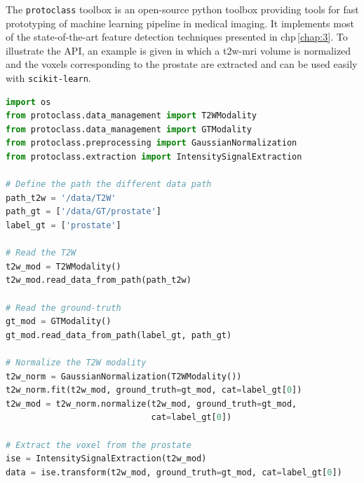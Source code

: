 The \texttt{protoclass} toolbox is an open-source python toolbox providing tools for fast prototyping of machine learning pipeline in medical imaging.
It implements most of the state-of-the-art feature detection techniques presented in \acs{chp}\,\ref{chap:3}.
To illustrate the API, an example is given in which a \ac{t2w}-\ac{mri} volume is normalized and the voxels corresponding to the prostate are extracted and can be used easily with \texttt{scikit-learn}.

\begin{lstlisting}[language=Python, caption=Code snippet to normalize a volume and extract some voxels.]
import os
from protoclass.data_management import T2WModality
from protoclass.data_management import GTModality
from protoclass.preprocessing import GaussianNormalization
from protoclass.extraction import IntensitySignalExtraction

# Define the path the different data path
path_t2w = '/data/T2W'
path_gt = ['/data/GT/prostate']
label_gt = ['prostate']

# Read the T2W
t2w_mod = T2WModality()
t2w_mod.read_data_from_path(path_t2w)

# Read the ground-truth
gt_mod = GTModality()
gt_mod.read_data_from_path(label_gt, path_gt)

# Normalize the T2W modality
t2w_norm = GaussianNormalization(T2WModality())
t2w_norm.fit(t2w_mod, ground_truth=gt_mod, cat=label_gt[0])
t2w_mod = t2w_norm.normalize(t2w_mod, ground_truth=gt_mod,
                             cat=label_gt[0])

# Extract the voxel from the prostate
ise = IntensitySignalExtraction(t2w_mod)
data = ise.transform(t2w_mod, ground_truth=gt_mod, cat=label_gt[0])
\end{lstlisting}

